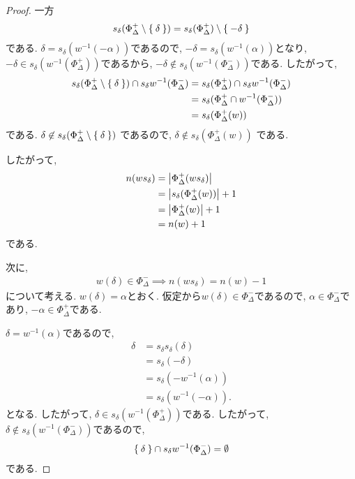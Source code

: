\begin{proof}
  一方
  \begin{align*}
    s_\delta(\Phi_\Delta^+\setminus \Set{\delta})=s_\delta(\Phi_\Delta^+)\setminus\Set{-\delta}
  \end{align*}
  である.
  $\delta=s_\delta(w^{-1}(-\alpha))$であるので,
  $-\delta=s_\delta(w^{-1}(\alpha))$となり,  
  $-\delta\in s_\delta(w^{-1}(\Phi_\Delta^+))$であるから,
  $-\delta\not\in s_\delta(w^{-1}(\Phi_\Delta^-))$である.
  したがって,
  \begin{align*}
    s_\delta(\Phi_\Delta^+\setminus \Set{\delta}) \cap s_\delta w^{-1}(\Phi_\Delta^-)
    &=
    s_\delta(\Phi_\Delta^+) \cap s_\delta w^{-1}(\Phi_\Delta^-)\\
    &=s_\delta(\Phi_\Delta^+ \cap w^{-1}(\Phi_\Delta^-))\\
    &=s_\delta(\Phi_\Delta^+(w))
  \end{align*}
  である. 
  $\delta\not\in s_\delta(\Phi_\Delta^+\setminus \Set{\delta})$
  であるので, $\delta\not\in s_\delta(\Phi_\Delta^+(w))$
  である.

  したがって,
  \begin{align*}
    n(ws_\delta)
    &=\left|\Phi_\Delta^+(ws_\delta)\right|\\
    &=\left|s_\delta(\Phi_\Delta^+(w))\right|+1\\
    &=\left|\Phi_\Delta^+(w)\right|+1\\
    &=n(w)+1\\
  \end{align*}
  である.
  
  次に,
  \begin{align*}
    w(\delta)\in\Phi_\Delta^- \implies n(ws_\delta)=n(w)-1
  \end{align*}
  について考える.
  $w(\delta)=\alpha$とおく.
  仮定から$w(\delta)\in\Phi_\Delta^-$であるので,
  $\alpha\in\Phi_\Delta^-$であり,
  $-\alpha\in\Phi_\Delta^+$である.
    
  $\delta=w^{-1}(\alpha)$であるので,
  \begin{align*}
    \delta
    &=s_\delta s_\delta(\delta)\\
    &=s_\delta (-\delta)\\
    &=s_\delta(- w^{-1}(\alpha))\\
    &=s_\delta(w^{-1}(-\alpha)).
  \end{align*}
  となる. したがって,
  $\delta\in s_\delta(w^{-1}(\Phi_\Delta^+))$である.
  したがって,
  $\delta\not\in s_\delta(w^{-1}(\Phi_\Delta^-))$であるので,
  \begin{align*}
    \Set{\delta} \cap s_\delta w^{-1}(\Phi_\Delta^-) = \emptyset
  \end{align*}
  である.
  


\end{proof}
